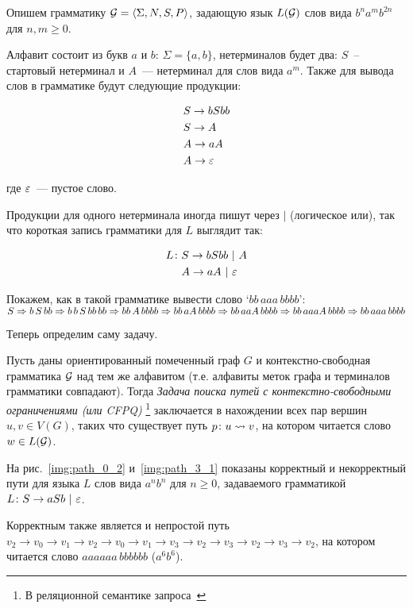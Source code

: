 \begin{example}\label{example:bab}
  Опишем грамматику $\mathcal{G} = \langle \Sigma, N, S, P \rangle$, задающую язык $L(\mathcal{G})$ слов вида $b^n a^m b^{2n}$ для $n, m \ge 0$.

  Алфавит состоит из букв $a$ и $b$: $\Sigma = \{ a, b \}$, нетерминалов будет два: $S$~-- стартовый нетерминал и $A$~--- нетерминал для слов вида $a^m$. Также для вывода слов в грамматике будут следующие продукции:

  \begin{align*}
    &S \rightarrow b S bb \\
    &S \rightarrow A \\
    &A \rightarrow a A \\
    &A \rightarrow \varepsilon
  \end{align*}

  где $\varepsilon$~--- пустое слово.

  Продукции для одного нетерминала иногда пишут через $|$ (логическое или), так что короткая запись грамматики для $L$ выглядит так:

  \begin{align*}
    L \colon &S \rightarrow b S bb ~|~ A \\
    &A \rightarrow aA ~|~ \varepsilon
  \end{align*}

  Покажем, как в такой грамматике вывести слово `$bb\,aaa\,bbbb$':\\ $S \Rightarrow b\,S\,bb \Rightarrow  b\,b\,S\,bb\,bb \Rightarrow bb\,A\,bbbb \Rightarrow bb\,aA\,bbbb \Rightarrow bb\,aaA\,bbbb \Rightarrow bb\,aaaA\,bbbb \Rightarrow bb\,aaa\,bbbb$

\end{example}

Теперь определим саму задачу.

\begin{definition}
  Пусть даны ориентированный помеченный граф $G$ и контекстно-свободная грамматика $\mathcal{G}$ над тем же алфавитом (т.е. алфавиты меток графа и терминалов грамматики совпадают).
  Тогда \textit{Задача поиска путей с контекстно-свободными ограничениями (или CFPQ)} \footnote{В реляционной семантике запроса~\cite{Hellings16}} заключается в нахождении всех пар вершин $u, v \in V(G)$, таких что существует путь $p \colon u \rightsquigarrow v$, на котором читается слово $w \in L(\mathcal{G})$.

\end{definition}

\begin{example}
  На рис.~\ref{img:path_0_2} и~\ref{img:path_3_1} показаны корректный и некорректный пути для языка $L$ слов вида $a^n b^n$ для $n \ge 0$, задаваемого грамматикой $L \colon S \rightarrow aSb ~|~ \varepsilon$.

  Корректным также является и непростой путь $v_2 \to v_0 \to v_1 \to v_2 \to v_0 \to v_1 \to v_3 \to v_2 \to v_3 \to v_2 \to v_3 \to v_2$, на котором читается слово $aaaaaa\,bbbbbb$ ($a^6 b^6$).
\end{example}

